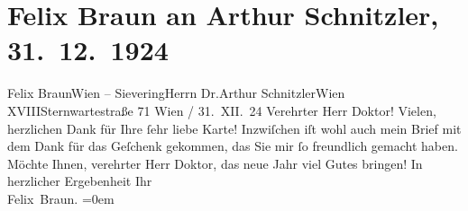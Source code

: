 

         \renewcommand{\erwaehnteOrte}{Orte: Sievering, Sternwartestraße, Wien, XVI., Ottakring, XVIII., Währing}
         \renewcommand{\erwaehnteWerke}{Werke: Fräulein Else}
               \section[Felix Braun an Arthur Schnitzler, 31. 12. 1924]{ Felix Braun an Arthur Schnitzler, 31. 12. 1924}\nopagebreak{}\rehead{ }\begin{ledgroupsized}[t]{13cm}\normalsize\beginnumbering \toendnotes[C]{\smallbreak\pagebreak[2]} 
\toendnotes[C]{\smallbreak}\pstart{}{\pb}Felix Braun\pend{}\pstart{}Wien – Sievering\pend{}{\bigskip}\pstart{}Herrn Dr.\pend{}\pstart{}Arthur Schnitzler\pend{}\pstart{}Wien XVIII\pend{}\pstart{}Sternwartestraße 71\pend{}{\bigskip}\pstart
           \centering{}{\pb}Wien / 31. XII. 24\pend
           \pstart{}Verehrter Herr Doktor!\pend\pstart
           Vielen, herzlichen Dank für Ihre ſehr liebe Karte! Inzwiſchen iſt wohl auch mein
               Brief mit dem Dank für das Geſchenk gekommen, das Sie mir ſo freundlich gemacht haben. Möchte Ihnen,
               verehrter Herr Doktor, das neue Jahr viel Gutes bringen!\pend
           \pstart
           In herzlicher Ergebenheit Ihr{\\[\baselineskip]}\spacefill\mbox{Felix Braun.}\pend
           \leftskip=0em{}
         
         \endnumbering{}\end{ledgroupsized}  \newcommand{\dateiname}{L02428}\newcommand{\titel}{Felix Braun an Arthur Schnitzler, 31. 12. 1924}\newcommand{\editorInnen}{Martin Anton Müller und Gerd-Hermann Susen}
      